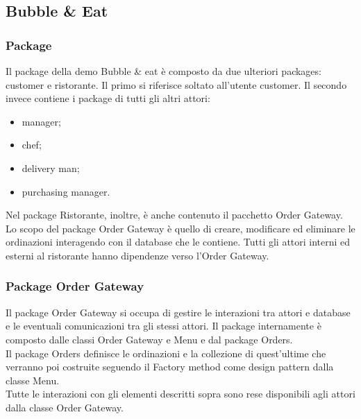 \subsection{Bubble \& Eat}

\subsubsection{Package}
Il package della demo Bubble \& eat è composto da due ulteriori packages: customer e ristorante. 
Il primo si riferisce soltato all'utente customer. Il secondo invece contiene i package di tutti gli altri attori:
\begin{itemize}
	\item manager;
	\item chef;
	\item delivery man;
	\item purchasing manager.
\end{itemize}
Nel package Ristorante, inoltre, è anche contenuto il pacchetto Order Gateway.\\
Lo scopo del package Order Gateway è quello di creare, modificare ed eliminare le ordinazioni interagendo con il database che le contiene.
Tutti gli attori interni ed esterni al ristorante hanno dipendenze verso l’Order Gateway.

\subsubsection{Package Order Gateway}
Il package Order Gateway si occupa di gestire le interazioni tra attori e database e le eventuali comunicazioni tra gli stessi attori. Il package internamente è composto dalle classi Order Gateway e Menu e dal package Orders.\\
Il package Orders definisce le ordinazioni e la collezione di quest’ultime che verranno poi costruite seguendo il Factory method come design pattern dalla classe Menu.\\
Tutte le interazioni con gli elementi descritti sopra sono rese disponibili agli attori dalla classe Order Gateway.

